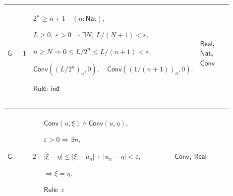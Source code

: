 \documentclass[12pt,reqno]{amsart}
\theoremstyle{blueplain}
\numberwithin{equation}{section}
\begin{document}
{\scriptsize \setlength{\parskip}{0pt}\nointerlineskip
\noindent 
\begin{tabular}{|@{}>{\centering\arraybackslash}m{0.10658\linewidth}|>{\centering\arraybackslash}m{0.03553\linewidth}|>{\centering\arraybackslash}m{0.52105\linewidth}|>{\centering\arraybackslash}m{0.23684\linewidth}|}
\hline
\hypertarget{proof:G1}{$\displaystyle \mathsf{G}$} & $\displaystyle 1$ & $%
\displaystyle 2^n\ge n+1\quad(n:\mathsf{Nat}),$\par$\displaystyle L\ge0,\
\varepsilon>0\Rightarrow\exists N,\ L/(N+1)<\varepsilon,$\par$\displaystyle %
n\ge N\Rightarrow0\le L/2^n\le L/(n+1)<\varepsilon,$\par$\displaystyle 
\mathsf{Conv}((L/2^n)_n,0),\quad\mathsf{Conv}((1/(n+1))_n,0).$\par$%
\displaystyle \mathsf{Rule}:\ \mathsf{ind}$ & \hyperlink{ax:Real}{$%
\displaystyle \mathsf{Real}$}, \hyperlink{ax:Nat}{$\displaystyle \mathsf{Nat}
$}, \hyperlink{def:Conv}{$\displaystyle \mathsf{Conv}$} \\ \hline
\end{tabular}%
}

{\scriptsize \setlength{\parskip}{0pt}\nointerlineskip
\noindent 
\begin{tabular}{|@{}>{\centering\arraybackslash}m{0.10658\linewidth}|>{\centering\arraybackslash}m{0.03553\linewidth}|>{\centering\arraybackslash}m{0.52105\linewidth}|>{\centering\arraybackslash}m{0.23684\linewidth}|}
\hline
\hypertarget{proof:G2}{$\displaystyle \mathsf{G}$} & $\displaystyle 2$ & $%
\displaystyle \mathsf{Conv}(u,\xi)\land\mathsf{Conv}(u,\eta),$\par$%
\displaystyle \varepsilon>0\Rightarrow\exists n,$\par$\displaystyle %
|\xi-\eta|\le|\xi-u_n|+|u_n-\eta|<\varepsilon,$\par$\displaystyle %
\Rightarrow\xi=\eta.$\par$\displaystyle \mathsf{Rule}:\ \varepsilon$ & 
\hyperlink{def:Conv}{$\displaystyle \mathsf{Conv}$}, \hyperlink{ax:Real}{$%
\displaystyle \mathsf{Real}$} \\ \hline
\end{tabular}%
}
\end{document}
